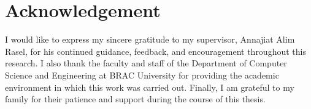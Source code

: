 \chapter*{Acknowledgement}

I would like to express my sincere gratitude to my supervisor, Annajiat
Alim Rasel, for his continued guidance, feedback, and encouragement
throughout this research. I also thank the faculty and staff of the
Department of Computer Science and Engineering at BRAC University for
providing the academic environment in which this work was carried out.
Finally, I am grateful to my family for their patience and support during
the course of this thesis.
